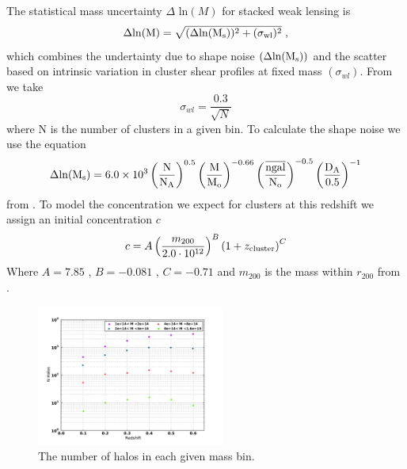The statistical mass uncertainty $\Delta$ ln$(M)$ for stacked weak lensing is \citep{obscos}
\begin{equation}
\Delta \rm{ln}(M) = \sqrt{ (\Delta  \rm{ln} (M_{s}))^2 +
(\sigma_{wl} )^2 } \; ,
\end{equation}
which combines the undertainty due to shape noise $(\Delta  \rm{ln} (M_{s}))$ and the scatter based on intrinsic variation in cluster shear profiles at fixed mass $(\sigma_{wl})$. From \citet{mbecker}
we take \citep[cf. also][]{ccv}
\begin{equation}
\sigma_{wl} = \frac{0.3}{\sqrt{N}}
\end{equation}
where N is the number of clusters in a given bin. To calculate the
shape noise we use the equation
\begin{equation}
\Delta \rm{ln} (M_{s}) = 6.0\times10^3
\left( \frac{N}{N_{A}} \right)^{0.5} \left( \frac{M}{M_{o}} \right)^{-0.66} \left( \frac{\overline{ngal}}{N_{o}} \right)^{-0.5}\left( \frac{D_{A}}{0.5} \right)^{-1}
\end{equation}
from \citet{obscos} . To model the concentration we expect
for clusters at this redshift we assign an initial concentration $c$
\begin{equation}
c= A \left(  m_{200} \over 2.0 \cdot 10^{12}  \right)^{B} \left( 1 + z_{\rm{cluster}} \right)^{C}
\end{equation}
Where  $ A = 7.85 $ ,  $ B = -0.081 $ , $ C= -0.71 $ and $m_{200}$ is
the mass within $r_{200}$ from \citep{oguri}. 

\begin{figure}
 \centering  %
  \includegraphics[width=0.55\textwidth]{fig/Halo_N.pdf} 
  \caption{The number of halos in each given mass bin.}
\label{fig:N_Halo}
\end{figure} 
